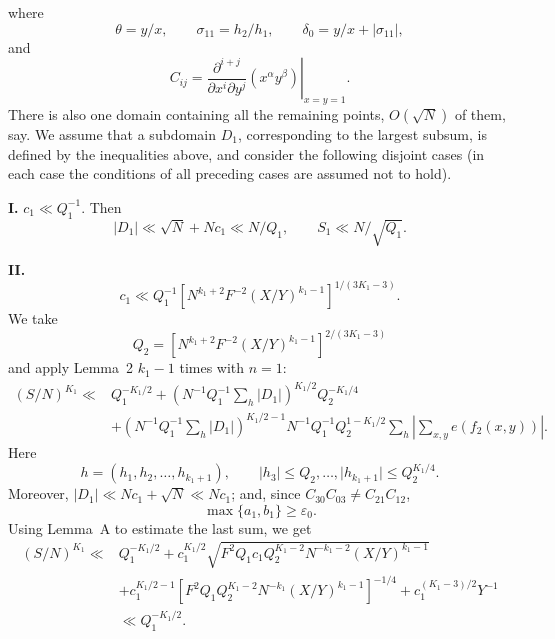 \documentclass[10pt]{article}
\begin{document}
where
\[
  \theta=y/x,\qquad \sigma_{11}=h_2/h_1,\qquad
  \delta_0=y/x+\lvert\sigma_{11}\rvert,
\]
and
\[
  C_{ij}=\left.
  \frac{\partial^{i+j}}{\partial x^i\partial y^j}(x^\alpha y^\beta)
  \right|_{x=y=1}.
\]
There is also one domain containing all the remaining points, $O(\sqrt N)$ of them, say. We assume that a subdomain $D_1$, corresponding to the largest subsum, is defined by the inequalities above, and consider the following disjoint cases (in each case the conditions of all preceding cases are assumed not to hold).

\medskip
\noindent\textbf{I.} $c_1\ll Q_1^{-1}$. Then
\[
  \lvert D_1\rvert\ll\sqrt N+Nc_1\ll N/Q_1,
  \qquad S_1\ll N/\sqrt{Q_1}.
\]

\medskip
\noindent\textbf{II.}
\[
  c_1\ll Q_1^{-1}
  \left[N^{k_1+2}F^{-2}(X/Y)^{k_1-1}\right]^{1/(3K_1-3)}.
\]
We take
\[
  Q_2=\left[N^{k_1+2}F^{-2}(X/Y)^{k_1-1}\right]^{2/(3K_1-3)}
\]
and apply Lemma~2 $k_1-1$ times with $n=1$:
\[
\begin{aligned}
(S/N)^{K_1}\ll{}&Q_1^{-K_1/2}
 +\left(N^{-1}Q_1^{-1}\sum_h\lvert D_1\rvert\right)^{K_1/2}
  Q_2^{-K_1/4}\\
&+\left(N^{-1}Q_1^{-1}\sum_h\lvert D_1\rvert\right)^{K_1/2-1}
 N^{-1}Q_1^{-1}Q_2^{1-K_1/2}
 \sum_h\left\lvert\sum_{x,y}e(f_2(x,y))\right\rvert.
\end{aligned}
\]
Here
\[
  h=(h_1,h_2,\ldots,h_{k_1+1}),\qquad
  \lvert h_3\rvert\leqslant Q_2,\ldots,
  \lvert h_{k_1+1}\rvert\leqslant Q_2^{K_1/4}.
\]
Moreover, $\lvert D_1\rvert\ll Nc_1+\sqrt N\ll Nc_1$; and, since
$C_{30}C_{03}\ne C_{21}C_{12}$,
\[
  \max\{a_1,b_1\}\geqslant\varepsilon_0.
\]
Using Lemma~A to estimate the last sum, we get
\[
\begin{aligned}
(S/N)^{K_1}\ll{}&Q_1^{-K_1/2}
+c_1^{K_1/2}
 \sqrt{F^2Q_1c_1Q_2^{K_1-2}N^{-k_1-2}(X/Y)^{k_1-1}}\\
&+c_1^{K_1/2-1}
 \left[F^2Q_1Q_2^{K_1-2}N^{-k_1}(X/Y)^{k_1-1}\right]^{-1/4}
+c_1^{(K_1-3)/2}Y^{-1}\\
&\ll Q_1^{-K_1/2}.
\end{aligned}
\]
\end{document}
